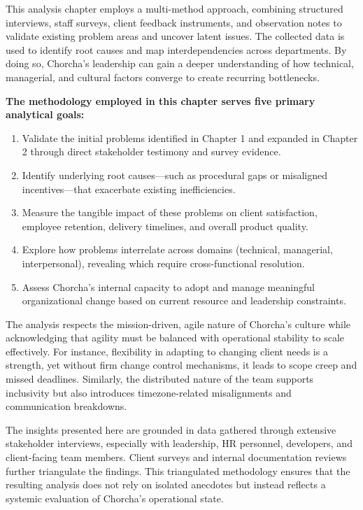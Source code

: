 \documentclass[12pt,a4paper,oneside]{book}
\begin{document}
\begin{tcolorbox}[infobox, title=Multi-Method Analysis Approach]
This analysis chapter employs a multi-method approach, combining structured interviews, staff surveys, client feedback instruments, and observation notes to validate existing problem areas and uncover latent issues. The collected data is used to identify root causes and map interdependencies across departments. By doing so, Chorcha's leadership can gain a deeper understanding of how technical, managerial, and cultural factors converge to create recurring bottlenecks.
\end{tcolorbox}

\textbf{The methodology employed in this chapter serves five primary analytical goals:}
\begin{enumerate}
    \item Validate the initial problems identified in Chapter 1 and expanded in Chapter 2 through direct stakeholder testimony and survey evidence.
    \item Identify underlying root causes—such as procedural gaps or misaligned incentives—that exacerbate existing inefficiencies.
    \item Measure the tangible impact of these problems on client satisfaction, employee retention, delivery timelines, and overall product quality.
    \item Explore how problems interrelate across domains (technical, managerial, interpersonal), revealing which require cross-functional resolution.
    \item Assess Chorcha’s internal capacity to adopt and manage meaningful organizational change based on current resource and leadership constraints.
\end{enumerate}

The analysis respects the mission-driven, agile nature of Chorcha’s culture while acknowledging that agility must be balanced with operational stability to scale effectively. For instance, flexibility in adapting to changing client needs is a strength, yet without firm change control mechanisms, it leads to scope creep and missed deadlines. Similarly, the distributed nature of the team supports inclusivity but also introduces timezone-related misalignments and communication breakdowns.

The insights presented here are grounded in data gathered through extensive stakeholder interviews, especially with leadership, HR personnel, developers, and client-facing team members. Client surveys and internal documentation reviews further triangulate the findings. This triangulated methodology ensures that the resulting analysis does not rely on isolated anecdotes but instead reflects a systemic evaluation of Chorcha’s operational state.
\end{document}
